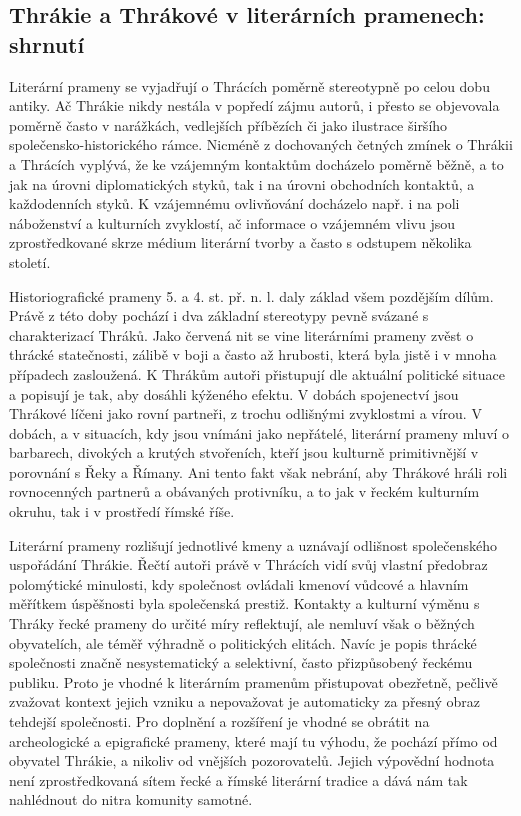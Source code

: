 \subsection[thrákie-a-thrákové-v-literárních-pramenech-shrnutí]{Thrákie a Thrákové v literárních pramenech: shrnutí}

Literární prameny se vyjadřují o Thrácích poměrně stereotypně po celou dobu antiky. Ač Thrákie nikdy nestála v popředí zájmu autorů, i přesto se objevovala poměrně často v narážkách, vedlejších příbězích či jako ilustrace širšího společensko-historického rámce. Nicméně z dochovaných četných zmínek o Thrákii a Thrácích vyplývá, že ke vzájemným kontaktům docházelo poměrně běžně, a to jak na úrovni diplomatických styků, tak i na úrovni obchodních kontaktů, a každodenních styků. K vzájemnému ovlivňování docházelo např. i na poli náboženství a kulturních zvyklostí, ač informace o vzájemném vlivu jsou zprostředkované skrze médium literární tvorby a často s odstupem několika století.

Historiografické prameny 5. a 4. st. př. n. l. daly základ všem pozdějším dílům. Právě z této doby pochází i dva základní stereotypy pevně svázané s charakterizací Thráků. Jako červená nit se vine literárními prameny zvěst o thrácké statečnosti, zálibě v boji a často až hrubosti, která byla jistě i v mnoha případech zasloužená. K Thrákům autoři přistupují dle aktuální politické situace a popisují je tak, aby dosáhli kýženého efektu. V dobách spojenectví jsou Thrákové líčeni jako rovní partneři, z trochu odlišnými zvyklostmi a vírou. V dobách, a v situacích, kdy jsou vnímáni jako nepřátelé, literární prameny mluví o barbarech, divokých a krutých stvořeních, kteří jsou kulturně primitivnější v porovnání s Řeky a Římany. Ani tento fakt však nebrání, aby Thrákové hráli roli rovnocenných partnerů a obávaných protivníku, a to jak v řeckém kulturním okruhu, tak i v prostředí římské říše.

Literární prameny rozlišují jednotlivé kmeny a uznávají odlišnost společenského uspořádání Thrákie. Řečtí autoři právě v Thrácích vidí svůj vlastní předobraz polomýtické minulosti, kdy společnost ovládali kmenoví vůdcové a hlavním měřítkem úspěšnosti byla společenská prestiž. Kontakty a kulturní výměnu s Thráky řecké prameny do určité míry reflektují, ale nemluví však o běžných obyvatelích, ale téměř výhradně o politických elitách. Navíc je popis thrácké společnosti značně nesystematický a selektivní, často přizpůsobený řeckému publiku. Proto je vhodné k literárním pramenům přistupovat obezřetně, pečlivě zvažovat kontext jejich vzniku a nepovažovat je automaticky za přesný obraz tehdejší společnosti. Pro doplnění a rozšíření je vhodné se obrátit na archeologické a epigrafické prameny, které mají tu výhodu, že pochází přímo od obyvatel Thrákie, a nikoliv od vnějších pozorovatelů. Jejich výpovědní hodnota není zprostředkovaná sítem řecké a římské literární tradice a dává nám tak nahlédnout do nitra komunity samotné.

